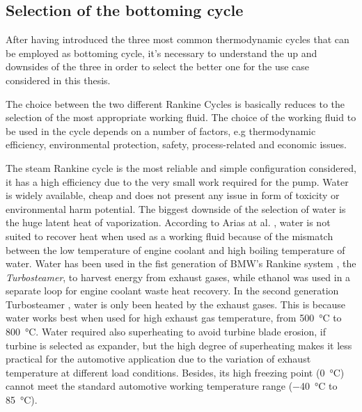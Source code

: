 \subsection{Selection of the bottoming cycle}

After having introduced the three most common thermodynamic cycles that can be employed as bottoming cycle, it's necessary to understand the up and downsides of the three in order to select the better one for the use case considered in this thesis.

The choice between the two different Rankine Cycles is basically reduces to the selection of the most appropriate working fluid. The choice of the working fluid to be used in the cycle depends on a number of factors, e.g thermodynamic efficiency, environmental protection, safety, process-related and economic issues.

The steam Rankine cycle is the most reliable and simple configuration considered, it has a high efficiency due to the very small work required for the pump. Water is widely available, cheap and does not present any issue in form of toxicity or environmental harm potential. The biggest downside of the selection of water is the huge latent heat of vaporization. According to Arias at al. \cite{Arias2006}, water is not suited to recover heat when used as a working fluid because of the mismatch between the low temperature of engine coolant and high boiling temperature of water. Water has been used in the fist generation of BMW's Rankine system \cite{Freymann2008}, the \emph{Turbosteamer}, to harvest energy from exhaust gases, while ethanol was used in a separate loop for engine coolant waste heat recovery. In the second generation Turbosteamer \cite{Freymann2012}, water is only been heated by the exhaust gases. This is because water works best when used for high exhaust gas temperature, from \SI{500}{\celsius} to \SI{800}{\celsius}. Water required also superheating to avoid turbine blade erosion, if turbine is selected as expander, but the high degree of superheating makes it less practical for the automotive application due to the variation of exhaust temperature at different load conditions. Besides, its high freezing point (\SI{0}{\celsius}) cannot meet the standard automotive working temperature range (\SI{-40}{\celsius} to \SI{85}{\celsius}).

